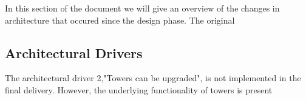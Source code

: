 In this section of the document we will give an overview of the changes in architecture that occured since the design phase. The original

\subsection{Architectural Drivers}

The architectural driver 2,"Towers can be upgraded", is not implemented in the final delivery. However, the underlying functionality of towers is present